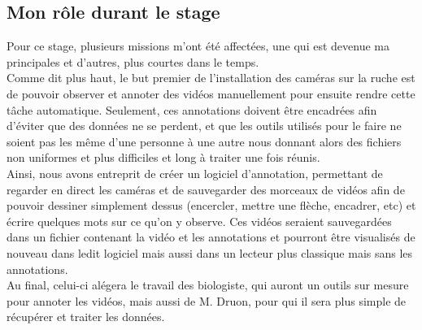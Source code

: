 \documentclass[11pt,french,a4paper]{report}
\begin{document}
\subsection{Mon rôle durant le stage}
Pour ce stage, plusieurs missions m'ont été affectées, une qui est devenue ma principales et d'autres, plus courtes dans le temps.\\

Comme dit plus haut, le but premier de l'installation des caméras sur la ruche est de pouvoir observer et annoter des vidéos manuellement
pour ensuite rendre cette tâche automatique. Seulement, ces annotations doivent être encadrées afin d'éviter que des données ne se perdent, 
et que les outils utilisés pour le faire ne soient pas les même d'une personne à une autre nous donnant alors des fichiers non 
uniformes et plus difficiles et long à traiter une fois réunis. \\
Ainsi, nous avons entreprit de créer un logiciel d'annotation, permettant de regarder en direct les caméras et de sauvegarder des 
morceaux de vidéos afin de pouvoir dessiner simplement dessus (encercler, mettre une flèche, encadrer, etc) et écrire quelques mots
sur ce qu'on y observe. Ces vidéos seraient sauvegardées dans un fichier contenant la vidéo et les annotations et pourront être 
visualisés de nouveau dans ledit logiciel mais aussi dans un lecteur plus classique mais sans les annotations. \\
Au final, celui-ci alégera le travail des biologiste, qui auront un outils sur mesure pour annoter les vidéos, mais aussi de M. Druon, 
pour qui il sera plus simple de récupérer et traiter les données.\\
\end{document}
